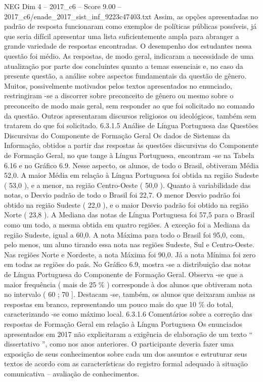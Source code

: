 \begin{textsample}{NEG Dim 4 – 2017\_c6 – Score 9.00 – 2017\_c6/enade\_2017\_sist\_inf\_9223c47403.txt}
Assim, as opções apresentadas no padrão de resposta funcionaram como exemplos de políticas públicas possíveis, já que seria difícil apresentar uma lista suficientemente ampla para abranger a grande variedade de respostas encontradas.
O desempenho dos estudantes nessa questão foi médio.
As respostas, de modo geral, indicaram a necessidade de uma atualização por parte dos concluintes quanto a temas essenciais e, no caso da presente questão, a análise sobre aspectos fundamentais da questão de gênero.
Muitos, possivelmente motivados pelos textos apresentados no enunciado, restringiram -se a discorrer sobre preconceito de gênero ou mesmo sobre o preconceito de modo mais geral, sem responder ao que foi solicitado no comando da questão.
Outros apresentaram discursos religiosos ou ideológicos, também sem tratarem do que foi solicitado. 6.3.1.5 Análise de Língua Portuguesa das Questões Discursivas do Componente de Formação Geral Os dados de Sistemas da Informação, obtidos a partir das respostas às questões discursivas do Componente de Formação Geral, no que tange à Língua Portuguesa, encontram -se na Tabela 6.16 e no Gráfico 6.9.
Nesse aspecto, os alunos, de todo o Brasil, obtiveram Média 52,0.
A maior Média em relação à Língua Portuguesa foi obtida na região Sudeste ( 53,0 ), e a menor, na região Centro-Oeste ( 50,0 ).
Quanto à variabilidade das notas, o Desvio padrão de todo o Brasil foi 22,7.
O menor Desvio padrão foi obtido na região Sudeste ( 22,0 ), e o maior Desvio padrão foi obtido na região Norte ( 23,8 ).
A Mediana das notas de Língua Portuguesa foi 57,5 para o Brasil como um todo, a mesma obtida em quatro regiões.
A exceção foi a Mediana da região Sudeste, igual a 60,0.
A nota Máxima para todo o Brasil foi 95,0, com, pelo menos, um aluno tirando essa nota nas regiões Sudeste, Sul e Centro-Oeste.
Nas regiões Norte e Nordeste, a nota Máxima foi 90,0.
Já a nota Mínima foi zero em todas as regiões do país.
No Gráfico 6.9, mostra -se a distribuição das notas de Língua Portuguesa do Componente de Formação Geral.
Observa -se que a maior frequência ( mais de 25 \% ) corresponde à dos alunos que obtiveram nota no intervalo ( 60 ; 70 ].
Destacam -se, também, os alunos que deixaram ambas as respostas em branco, representando um pouco mais do que 10 \% do total, caracterizando -se como máximo local. 6.3.1.6 Comentários sobre a correção das respostas de Formação Geral em relação à Língua Portuguesa Os enunciados apresentados em 2017 não explicitaram a exigência de elaboração de um texto “ dissertativo ”, como nos anos anteriores.
O participante deveria fazer uma exposição de seus conhecimentos sobre cada um dos assuntos e estruturar seus textos de acordo com as características do registro formal adequado à situação comunicativa – avaliação de conhecimentos.

\end{textsample}
